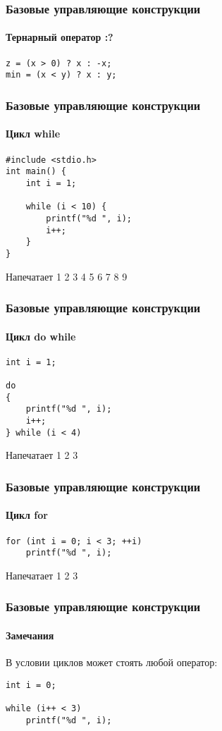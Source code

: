 \documentclass[12pt,pdf,hyperref={unicode}]{beamer}
\begin{document}
\begin{frame}[fragile]
\frametitle{Базовые управляющие конструкции} 
\framesubtitle{Тернарный оператор :?}

\begin{lstlisting}
z = (x > 0) ? x : -x;
min = (x < y) ? x : y;
\end{lstlisting}
\end{frame}


\begin{frame}[fragile]
\frametitle{Базовые управляющие конструкции} 
\framesubtitle{Цикл while}

\begin{lstlisting}
#include <stdio.h>
int main() {
    int i = 1;

    while (i < 10) {
        printf("%d ", i);
        i++;
    }
}
\end{lstlisting}

Напечатает 1 2 3 4 5 6 7 8 9

\end{frame}

\begin{frame}[fragile]
\frametitle{Базовые управляющие конструкции} 
\framesubtitle{Цикл do while}

\begin{lstlisting}
int i = 1;

do
{
	printf("%d ", i);
	i++;
} while (i < 4)
\end{lstlisting}

Напечатает 1 2 3 

\end{frame}

\begin{frame}[fragile]
\frametitle{Базовые управляющие конструкции} 
\framesubtitle{Цикл for}

\begin{lstlisting}
for (int i = 0; i < 3; ++i)
	printf("%d ", i);
\end{lstlisting}
Напечатает 1 2 3 

\end{frame}

\begin{frame}[fragile]
\frametitle{Базовые управляющие конструкции} 
\framesubtitle{Замечания}

В условии циклов может стоять любой оператор:

\begin{lstlisting}
int i = 0;

while (i++ < 3)
	printf("%d ", i);
\end{lstlisting}

\end{frame}
\end{document}
